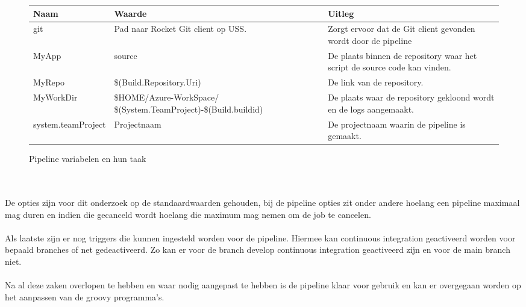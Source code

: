 \begin{figure}[h]
    \begin{tabularx}{1\textwidth} { 
            | >{\centering\arraybackslash}X 
            | >{\centering\arraybackslash}X 
            | >{\centering\arraybackslash}X  | }
        \hline
        \textbf{Naam} & 
        \textbf{Waarde} & 
        \textbf{Uitleg} \\
        \hline
        git &
        Pad naar Rocket Git client op USS. &
        Zorgt ervoor dat de Git client gevonden wordt door de pipeline \\ 
        \hline
        MyApp &
        source &
        De plaats binnen de repository waar het script de source code kan vinden. \\ 
        \hline
        MyRepo &
        \$(Build.Repository.Uri) &
        De link van de repository. \\ 
        \hline
        MyWorkDir &
        \$HOME/Azure-WorkSpace/ \$(System.TeamProject)-\$(Build.buildid) &
        De plaats waar de repository gekloond wordt en de logs aangemaakt. \\ 
        \hline
        system.teamProject &
        Projectnaam &
        De projectnaam waarin de pipeline is gemaakt. \\ 
        \hline
    \end{tabularx}
    \caption{Pipeline variabelen en hun taak}
    \label{tab:soorten pipeline variabelen}
\end{figure}
\\ \\
De opties zijn voor dit onderzoek op de standaardwaarden gehouden, bij de pipeline opties zit onder andere hoelang een pipeline maximaal mag duren en indien die gecanceld wordt hoelang die maximum mag nemen om de job te cancelen.  
\\ \\
Als laatste zijn er nog triggers die kunnen ingesteld worden voor de pipeline. Hiermee kan continuous integration geactiveerd worden voor bepaald branches of net gedeactiveerd. Zo kan er voor de branch develop continuous integration geactiveerd zijn en voor de main branch niet. 
\\ \\
Na al deze zaken overlopen te hebben en waar nodig aangepast te hebben is de pipeline klaar voor gebruik en kan er overgegaan worden op het aanpassen van de groovy programma's. 

